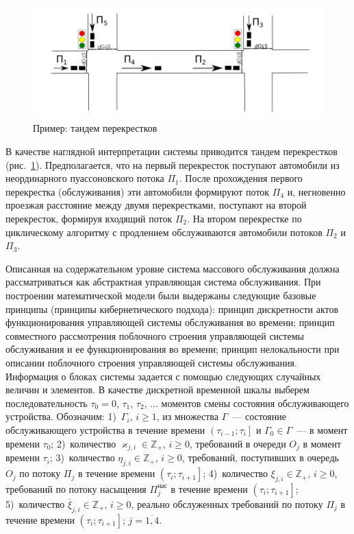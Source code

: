 \begin{figure}[h]\centering
\includegraphics[scale=0.4]{Pictures/Crossroads.png} 
\caption{Пример: тандем перекрестков}
\label{crossroads}
\end{figure}
В качестве наглядной интерпретации системы приводится тандем перекрестков (рис.~\ref{crossroads}). Предполагается, что на первый перекресток поступают автомобили из неординарного пуассоновского потока $\Pi_1$. После прохождения первого перекрестка (обслуживания) эти автомобили формируют поток $\Pi_4$ и, негновенно проезжая расстояние между двумя перекрестками, поступают на второй перекресток, формируя входящий поток $\Pi_2$. На втором перекрестке по циклическому алгоритму с продлением обслуживаются автомобили потоков $\Pi_2$ и $\Pi_3$.

Описанная на содержательном уровне система массового обслуживания должна рассматриваться как абстрактная управляющая система обслуживания. При построении математической модели были выдержаны следующие базовые принципы (принципы кибернетического подхода): принцип дискретности актов функционирования управляющей системы обслуживания во времени; принцип совместного рассмотрения поблочного строения управляющей системы обслуживания и ее функционирования во времени; принцип нелокальности при описании поблочного строения управляющей системы обслуживания. Информация о блоках системы задается с помощью следующих случайных величин и элементов. В качестве дискретной временной шкалы выберем последовательность $\tau_0=0$,  $\tau_1$,  $\tau_2$,  $\ldots$ моментов смены состояния обслуживающего устройства. Обозначим:
1)~$\Gamma_i$,  $i\geqslant 1$,  из множества $\Gamma$~--- состояние обслуживающего устройства в течение времени $\left(\tau_{i-1};\tau_i\right]$ и $\Gamma_0\in \Gamma$~--- в момент времени $\tau_0$;
2)~количество $\varkappa_{j, i} \in \mathbb{Z}_+ $,  $i\geqslant 0$,  требований в очереди $O_j$ в момент времени $\tau_i$;
3)~количество $\eta_{j, i} \in \mathbb{Z}_+$,  $i\geqslant 0$,  требований,  поступивших в очередь $O_j$ по потоку $\Pi_j$ в течение времени $\left(\tau_{i};\tau_{i+1}\right]$;
4)~количество $\xi_{j, i} \in \mathbb{Z}_+$,  $i\geqslant 0$,  требований по потоку насыщения $\Pi^{\mathrm{\text{нас}}}_j$ в течение времени $\left(\tau_{i};\tau_{i+1}\right]$;
5)~количество $\overline{\xi}_{j, i}\in \mathbb{Z}_+$,  $i\geqslant 0$,  реально обслуженных требований по потоку $\Pi_j$ в течение времени $\left(\tau_{i};\tau_{i+1}\right]$; $j=\overline{1, 4}$.

